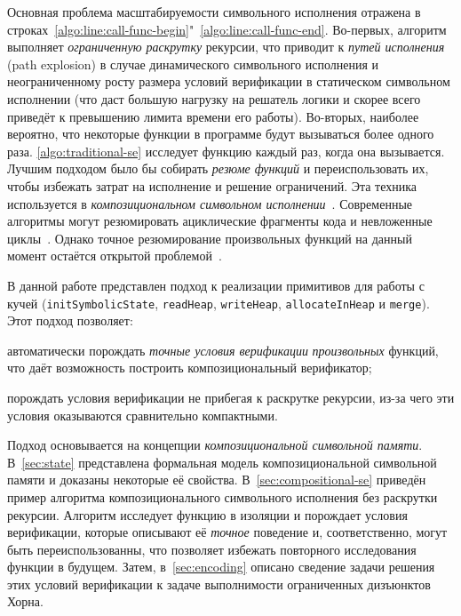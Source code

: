 Основная проблема масштабируемости символьного исполнения отражена в строках~\ref{algo:line:call-func-begin}"~\ref{algo:line:call-func-end}. Во-первых, алгоритм выполняет \emph{ограниченную раскрутку} рекурсии, что приводит к \emph{ путей исполнения} (path explosion) в случае динамического символьного исполнения и неограниченному росту размера условий верификации в статическом символьном исполнении (что даст большую нагрузку на решатель логики и скорее всего приведёт к превышению лимита времени его работы).
Во-вторых, наиболее вероятно, что некоторые функции в программе будут вызываться более одного раза. \autoref{algo:traditional-se} исследует функцию каждый раз, когда она вызывается. Лучшим подходом было бы собирать \emph{резюме функций} и переиспользовать их, чтобы избежать затрат на исполнение и решение ограничений. Эта техника используется в \emph{композициональном символьном исполнении}~\cite{christakis2015ic,godefroid2007compositional,lin2016compositional}. Современные алгоритмы могут резюмировать ациклические фрагменты кода и невложенные циклы~\cite{xie2016proteus}. Однако точное резюмирование произвольных функций на данный момент остаётся открытой проблемой~\cite{SurveySymExec-CSUR18}.

В данной работе представлен подход к реализации примитивов для работы с кучей (\texttt{initSymbolicState}, \texttt{readHeap}, \texttt{writeHeap}, \texttt{allocateInHeap} и \texttt{merge}). Этот подход позволяет:
\begin{enumerate*}[label=\alph*)]
    \item автоматически порождать \emph{точные условия верификации} \emph{произвольных} функций, что даёт возможность построить композициональный верификатор;
    \item порождать условия верификации не прибегая к раскрутке рекурсии, из-за чего эти условия оказываются сравнительно компактными.
\end{enumerate*}

Подход основывается на концепции \emph{композициональной символьной памяти}. В~\autoref{sec:state} представлена формальная модель композициональной символьной памяти и доказаны некоторые её свойства. В~\autoref{sec:compositional-se} приведён пример алгоритма композиционального символьного исполнения без раскрутки рекурсии. Алгоритм исследует функцию в изоляции и порождает условия верификации, которые описывают её \emph{точное} поведение и, соответственно, могут быть переиспользованны, что позволяет избежать повторного исследования функции в будущем. Затем, в~\autoref{sec:encoding} описано сведение задачи решения этих условий верификации к задаче выполнимости ограниченных дизъюнктов Хорна.
